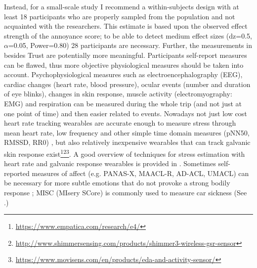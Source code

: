 Instead, for a small-scale study I recommend a within-subjects design with at least 18 participants who are properly sampled from the population and not acquainted with the researchers. This estimate is based upon the observed effect strength of the annoyance score; to be able to detect medium effect sizes (dz=0.5, \(\alpha\)=0.05, Power=0.80) 28 participants are necessary. Further, the measurements in  besides Trust are potentially more meaningful. Participants self-report measures can be flawed, thus more objective physiological measures should be taken into account.  Psychophysiological measures such as electroencephalography (EEG), cardiac changes (heart rate, blood pressure), ocular events (number and duration of eye blinks), changes in skin response, muscle activity (electromyography: EMG) and respiration \cite{Tichon2014PhysiologicalTraining} can be measured during the whole trip (and not just at one point of time) and then easier related to events. Nowadays not just low cost heart rate tracking wearables are accurate enough to measure stress through mean heart rate, low frequency and other simple time domain measures (pNN50, RMSSD, RR0) \cite{Salai2016}, but also relatively inexpensive wearables that can track galvanic skin response exist\footnote{\url{https://www.empatica.com/research/e4/}}\fnsep\footnote{\url{http://www.shimmersensing.com/products/shimmer3-wireless-gsr-sensor}}\fnsep\footnote{\url{https://www.movisens.com/en/products/eda-and-activity-sensor/}}. A good overview of techniques for stress estimation with heart rate and galvanic response wearables is provided in \cite{Ollander2015WearableEstimation}. Sometimes self-reported measures of affect (e.g. PANAS-X, MAACL-R, AD-ACL, UMACL) can be necessary for more subtle emotions that do not provoke a strong bodily response \cite{Boyle2015MeasuresDimensions}; MISC (MIsery SCore) is commonly used to measure car sickness (See .) %

